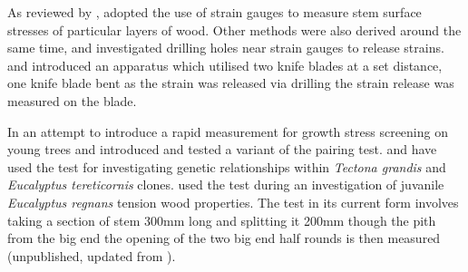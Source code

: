 As reviewed by \cite{kubler_1987}, \cite{Okuyama_1981} adopted the use of strain gauges to measure stem surface
stresses of particular layers of wood. Other methods were also derived around
the same time, \cite{gueneau1973}\cite{gueneau1973b} and \cite{kikata1977} investigated drilling holes near strain gauges to release strains.
\cite{Gueneau1974} and \cite{Saurat_1976} introduced an apparatus which utilised two knife
blades at a set distance, one knife blade bent as the strain was released via
drilling the strain release was measured on the blade. 

In an attempt to introduce a rapid measurement for growth stress screening on young trees \cite{Chauhan_2010} and \cite{Entwistle_2014} introduced and tested a variant of the pairing test. \cite{naranjo2012early} and \cite{Aggarwal_2013} have used the test for investigating genetic relationships within \textit{Tectona grandis} and \textit{Eucalyptus tereticornis} clones. \cite{Chauhan_2011} used the test during an investigation of juvanile \textit{Eucalyptus regnans} tension wood properties. The test in its current form involves taking a section of stem 300mm long and splitting it 200mm though the pith from the big end the opening of the two big end half rounds is then measured (unpublished, updated from \cite{Chauhan_2011}).  